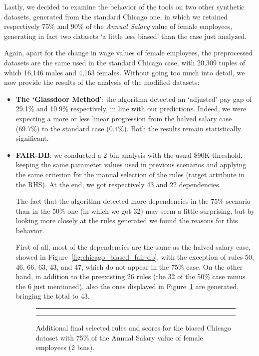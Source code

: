 \begin{itemize}
\begin{itemize}
\end{itemize}
\end{itemize}

Lastly, we decided to examine the behavior of the tools on two other synthetic datasets, generated from the standard Chicago one, in which we retained respectively 75\% and 90\% of the \textit{Annual Salary} value of female employees, generating in fact two datasets `a little less biased' than the case just analyzed.

Again, apart for the change in wage values of female employees, the preprocessed datasets are the same used in the standard Chicago case, with 20,309 tuples of which 16,146 males and 4,163 females. Without going too much into detail, we now provide the results of the analysis of the modified datasets:
\begin{itemize}
\item \textbf{The `Glassdoor Method'}: the algorithm detected an `adjusted' pay gap of 29.1\% and 10.9\% respectively, in line with our predictions. Indeed, we were expecting a more or less linear progression from the halved salary case (69.7\%) to the standard case (0.4\%). Both the results remain statistically significant.
\item \textbf{FAIR-DB}: we conducted a 2-bin analysis with the usual \$90K threshold, keeping the same parameter values used in previous scenarios and applying the same criterion for the manual selection of the rules (target attribute in the RHS). At the end, we got respectively 43 and 22 dependencies.

The fact that the algorithm detected more dependencies in the 75\% scenario than in the 50\% one (in which we got 32) may seem a little surprising, but by looking more closely at the rules generated we found the reasons for this behavior.

First of all, most of the dependencies are the same as the halved salary case, showed in Figure~\ref{fig:chicago_biased_fair-db}, with the exception of rules 50, 46, 66, 63, 43, and 47, which do not appear in the 75\% case. On the other hand, in addition to the preexisting 26 rules (the 32 of the 50\% case minus the 6 just mentioned), also the ones displayed in Figure~\ref{fig:chicago_biased75_fair-db} are generated, bringing the total to 43.

\begin{figure}[p]
\centering
\noindent\rule{\linewidth}{0.4pt}\par
\end{figure}
\begin{figure}[t!]
\ContinuedFloat
\centering
\noindent\rule{\linewidth}{0.4pt}
\caption{Additional final selected rules and scores for the biased Chicago dataset with 75\% of the \textrm{Annual Salary} value of female employees (2 bins).}
\label{fig:chicago_biased75_fair-db}
\end{figure}


\end{itemize}
